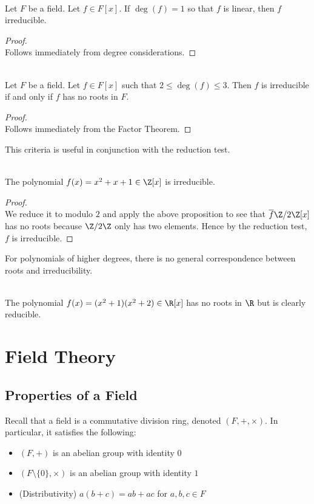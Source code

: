 \documentclass[a4paper]{article}
\begin{document}
\begin{prp}{}{}\\
Let $F$ be a field. Let $f\in F[x]$. If $\deg(f)=1$ so that $f$ is linear, then $f$ irreducible. 
\begin{proof}\\
Follows immediately from degree considerations. 
\end{proof}
\end{prp}

\begin{prp}{}{}\\
Let $F$ be a field. Let $f\in F[x]$ such that $2\leq\deg(f)\leq 3$. Then $f$ is irreducible if and only if $f$ has no roots in $F$. 
\begin{proof}\\
Follows immediately from the Factor Theorem. 
\end{proof}
\end{prp}

This criteria is useful in conjunction with the reduction test. 

\begin{eg}{}{}\\
The polynomial $f(x)=x^2+x+1\in\Z[x]$ is irreducible. 
\begin{proof}\\
We reduce it to modulo $2$ and apply the above proposition to see that $\overline{f}\Z/2\Z[x]$ has no roots because $\Z/2\Z$ only has two elements. Hence by the reduction test, $f$ is irreducible. 
\end{proof}
\end{eg}

For polynomials of higher degrees, there is no general correspondence between roots and irreducibility. 

\begin{eg}{}{}\\
The polynomial $f(x)=(x^2+1)(x^2+2)\in\R[x]$ has no roots in $\R$ but is clearly reducible. 
\end{eg}

\pagebreak
\section{Field Theory}
\subsection{Properties of a Field}
Recall that a field is a commutative division ring, denoted $(F,+,\times)$. In particular, it satisfies the following: 
\begin{itemize}
\item $(F,+)$ is an abelian group with identity $0$
\item $(F\setminus\{0\},\times)$ is an abelian group with identity $1$
\item (Distributivity) $a(b+c)=ab+ac$ for $a,b,c\in F$
\end{itemize}
\end{document}
